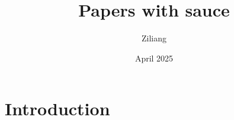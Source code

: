 \documentclass{article}
\title{Papers with sauce}
\author{Ziliang }
\date{April 2025}
\begin{document}
\maketitle

\section{Introduction}
\end{document}
